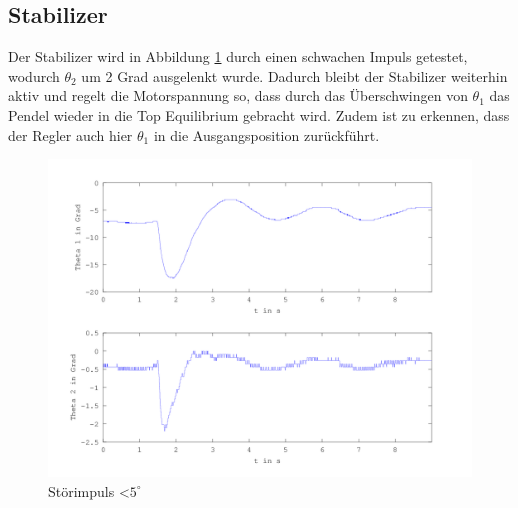 \subsection{Stabilizer}

Der Stabilizer wird in Abbildung \ref{fig.Stabilisierer-Plot} durch einen schwachen Impuls getestet, wodurch $\theta_2$ um 2 Grad ausgelenkt wurde. Dadurch bleibt der Stabilizer weiterhin aktiv und regelt die Motorspannung so, dass durch das Überschwingen von $ \theta_1$ das Pendel wieder in die Top Equilibrium gebracht wird. Zudem ist zu erkennen, dass der Regler auch hier $ \theta_1$ in die Ausgangsposition zurückführt. \newpage

\begin{figure}[htbp]
	\centering
	\includegraphics[width=1.\textwidth]{Grafiken/Stab_lang.png}
	\caption{Störimpuls \textless $5^{\circ}$}
	\label{fig.Stabilisierer-Plot}
\end{figure}


